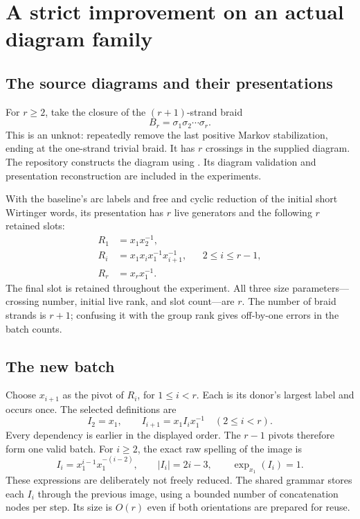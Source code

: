 \section{A strict improvement on an actual diagram family}
\label{sec:family}

\subsection{The source diagrams and their presentations}

For $r\geq 2$, take the closure of the $(r+1)$-strand braid
\[
 B_r=\sigma_1\sigma_2\cdots\sigma_r.
\]
This is an unknot: repeatedly remove the last positive Markov stabilization,
ending at the one-strand trivial braid. It has $r$ crossings in the supplied
diagram. The repository constructs the diagram using
. Its diagram validation
and presentation reconstruction are included in the experiments.

With the baseline's arc labels and free and cyclic reduction of the initial short
Wirtinger words, its presentation has $r$ live generators and the following
$r$ retained slots:
\begin{align}
 R_1&=x_1x_2^{-1},\label{eq:chain-first}\\
 R_i&=x_1x_i x_1^{-1}x_{i+1}^{-1},
       &&2\leq i\leq r-1,\label{eq:chain-middle}\\
 R_r&=x_r x_1^{-1}.\label{eq:chain-last}
\end{align}
The final slot is retained throughout the experiment. All three size
parameters---crossing number, initial live rank, and slot count---are $r$.
The number of braid strands is $r+1$; confusing it with the group rank gives
off-by-one errors in the batch counts.

\subsection{The new batch}

Choose $x_{i+1}$ as the pivot of $R_i$, for $1\leq i<r$. Each is its donor's
largest label and occurs once. The selected definitions are
\begin{equation}
 I_2=x_1,\qquad I_{i+1}=x_1 I_i x_1^{-1}\quad(2\leq i<r).
 \label{eq:chain-images}
\end{equation}
Every dependency is earlier in the displayed order. The $r-1$ pivots
therefore form one valid batch. For $i\geq2$, the exact raw spelling of the
image is
\begin{equation}
 I_i=x_1^{i-1}x_1^{-(i-2)},\qquad
 |I_i|=2i-3,\qquad \operatorname{exp}_{x_1}(I_i)=1.
 \label{eq:chain-raw}
\end{equation}
These expressions are deliberately not freely reduced. The shared grammar
stores each $I_i$ through the previous image, using a bounded number of
concatenation nodes per step. Its size is $O(r)$ even if both orientations
are prepared for reuse.

